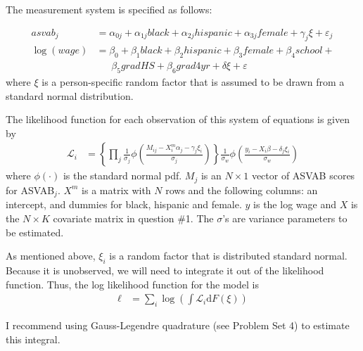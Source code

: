 \documentclass[12pt,english]{article}
\begin{document}
\begin{enumerate}
The measurement system is specified as follows:

\begin{align}
    asvab_j &= \alpha_{0j} + \alpha_{1j} black + \alpha_{2j} hispanic + \alpha_{3j} female + \gamma_j\xi + \varepsilon_j \\
    \log(wage) &= \beta_0 + \beta_1 black + \beta_2 hispanic + \beta_3 female + \beta_4 school + \\
    &\phantom{\text{==}}\beta_5 gradHS + \beta_6 grad4yr + \delta \xi + \varepsilon\nonumber
\end{align}
where $\xi$ is a person-specific random factor that is assumed to be drawn from a standard normal distribution.

The likelihood function for each observation of this system of equations is given by
\begin{align}
    \mathcal{L}_i &= \left\{\prod_j \frac{1}{\sigma_j}\phi\left(\frac{M_{ij} - X^m_{i}\alpha_j - \gamma_j \xi_i}{\sigma_j}\right)\right\}\frac{1}{\sigma_w}\phi\left(\frac{y_i - X_{i}\beta - \delta_j \xi_i}{\sigma_w}\right)
\end{align}
where $\phi\left(\cdot\right)$ is the standard normal pdf. $M_j$ is an $N\times 1$ vector of ASVAB scores for ASVAB$_j$. $X^m$ is a matrix with $N$ rows and the following columns: an intercept, and dummies for black, hispanic and female. $y$ is the log wage and $X$ is the $N\times K$ covariate matrix in question \#1. The $\sigma$'s are variance parameters to be estimated.

As mentioned above, $\xi_i$ is a random factor that is distributed standard normal. Because it is unobserved, we will need to integrate it out of the likelihood function. Thus, the log likelihood function for the model is
\begin{align}
    \ell &= \sum_i \log\left(\int \mathcal{L}_i \text{d} F\left(\xi\right)\right)
\end{align}

I recommend using Gauss-Legendre quadrature (see Problem Set 4) to estimate this integral. 

\end{enumerate}
\end{document}
